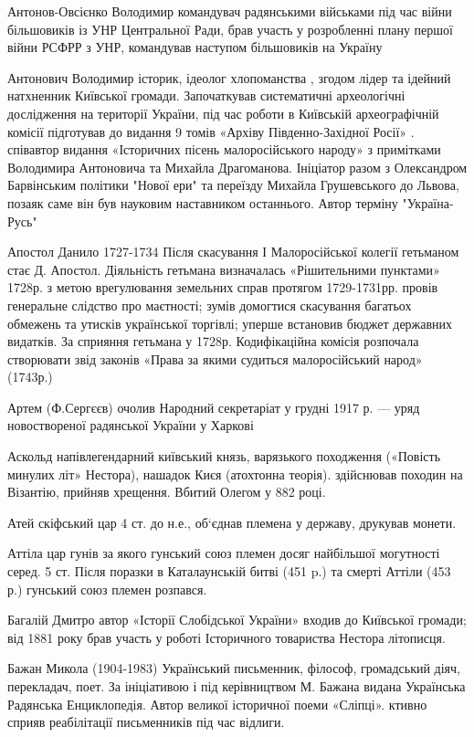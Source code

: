 Антонов-Овсієнко Володимир командувач радянськими військами під час війни більшовиків із УНР Центральної Ради, брав участь у розробленні плану першої війни РСФРР з УНР, командував наступом більшовиків на Україну 

Антонович Володимир історик, ідеолог хлопоманства , згодом лідер та ідейний натхненник Київської громади. Започаткував систематичні археологічні дослідження на території України, під час роботи в Київській археографічній комісії підготував до видання 9 томів «Архіву Південно-Західної Росії» . співавтор видання «Історичних пісень малоросійського народу» з примітками Володимира Антоновича та Михайла Драгоманова.  Ініціатор разом з Олександром Барвінським політики "Нової ери" та переїзду Михайла Грушевського до Львова, позаяк саме він був науковим наставником останнього. Автор терміну "Україна-Русь" 

Апостол Данило  1727-1734 Після скасування І Малоросійської колегії гетьманом стає Д. Апостол. Діяльність гетьмана визначалась «Рішительними пунктами» 1728р. з метою врегулювання земельних справ протягом 1729-1731рр. провів генеральне слідство про маєтності; зумів домогтися скасування багатьох обмежень та утисків української торгівлі; уперше встановив бюджет державних видатків. За сприяння гетьмана у 1728р. Кодифікаційна комісія розпочала створювати звід законів «Права за якими судиться малоросійський народ» (1743р.)

Артем (Ф.Сергєєв) очолив Народний секретаріат у грудні 1917 р. --- уряд новоствореної радянської України у Харкові

Аскольд напівлегендарний київський князь, варязького походження («Повість минулих літ» Нестора), нашадок Києя (атохтонна теорія). здійснював походин на Візантію, прийняв хрещення. Вбитий Олегом у 882 році.

Атей скіфський цар 4 ст. до н.е., об‘єднав племена у державу, друкував монети.

Аттіла цар гунів за якого гунський союз племен досяг найбільшої могутності серед. 5 ст. Після поразки в Каталаунській битві (451 p.) та смерті Аттіли (453 р.) гунський союз племен розпався.

Багалій Дмитро автор «Історії Слобідської України» входив до Київської громади; від 1881 року брав участь у роботі Історичного товариства Нестора літописця.   

Бажан Микола (1904-1983) Український письменник, філософ, громадський діяч, перекладач, поет. За ініціативою і під керівництвом М. Бажана видана Українська Радянська Енциклопедія. Автор великої історичної поеми «Сліпці». ктивно сприяв реабілітації письменників під час відлиги.

